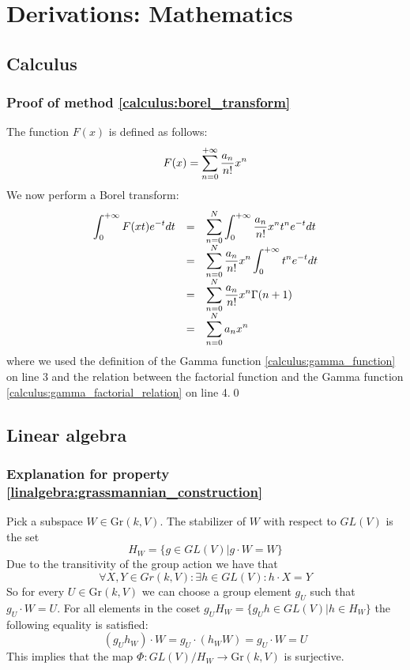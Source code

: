 \chapter{Derivations: Mathematics}

\section{Calculus}

\subsection{Proof of method \ref{calculus:borel_transform}}
	The function $F(x)$ is defined as follows:
	\begin{equation}
		F(x) = \ds\sum_{n=0}^{+\infty}\stylefrac{a_n}{n!}x^n
	\end{equation}
	We now perform a Borel transform:
	\begin{equation}
    		\begin{array}{ccl}
    			\ds\int_0^{+\infty}F(xt)e^{-t}dt&=&\ds\sum_{n=0}^N\int_0^{+\infty}\stylefrac{a_n}{n!}x^nt^ne^{-t}dt\\
        		&=&\ds\sum_{n=0}^N\frac{a_n}{n!}x^n\int_0^{+\infty}t^ne^{-t}dt\\
		        &=&\ds\sum_{n=0}^N\frac{a_n}{n!}x^n\Gamma(n+1)\\
		        &=&\ds\sum_{n=0}^Na_nx^n
	    	\end{array}
       	\end{equation}
       	where we used the definition of the Gamma function \ref{calculus:gamma_function} on line 3 and the relation between the factorial function and the Gamma function \ref{calculus:gamma_factorial_relation} on line 4.\qed

\section{Linear algebra}
\subsection{Explanation for property \ref{linalgebra:grassmannian_construction}}\label{proof:stabilizer}

	Pick a subspace $W\in \text{Gr}(k, V)$. The stabilizer of $W$ with respect to $GL(V)$ is the set \[H_W = \{g\in GL(V)| g\cdot W = W\}\]
	Due to the transitivity of the group action we have that
	\[\forall X, Y\in Gr(k, V): \exists h\in GL(V): h\cdot X = Y\]
	So for every $U\in \text{Gr}(k, V)$ we can choose a group element $g_U$ such that $g_U\cdot W = U$. For all elements in the coset $g_UH_W = \{g_Uh\in GL(V)|h\in H_W\}$ the following equality is satisfied:
	\[(g_Uh_W)\cdot W = g_U\cdot (h_WW) = g_U\cdot W = U\]
	This implies that the map $\Phi:GL(V)/H_W \rightarrow \text{Gr}(k, V)$ is surjective.
	
